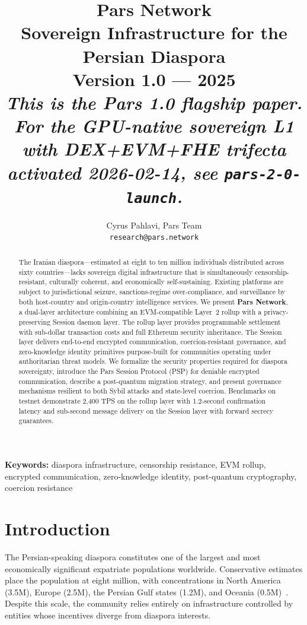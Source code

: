 \documentclass[11pt,a4paper]{article}
\title{
    \vspace{-1cm}
    {\Large\bfseries Pars Network}\\[0.5em]
    {\large Sovereign Infrastructure for the Persian Diaspora}\\[1em]
    {\normalsize Version 1.0 --- 2025}\\[0.4em]
    {\small\itshape This is the Pars 1.0 flagship paper.\\
    For the GPU-native sovereign L1 with DEX+EVM+FHE trifecta\\
    activated 2026-02-14, see \texttt{pars-2-0-launch}.}
}
\author{
    Cyrus Pahlavi, Pars Team\\
    {\small\texttt{research@pars.network}}
}
\date{}
\begin{document}
\parscoverpage


\begin{abstract}
The Iranian diaspora---estimated at eight to ten million individuals distributed across sixty countries---lacks sovereign digital infrastructure that is simultaneously censorship-resistant, culturally coherent, and economically self-sustaining.
Existing platforms are subject to jurisdictional seizure, sanctions-regime over-compliance, and surveillance by both host-country and origin-country intelligence services.
We present \textbf{Pars Network}, a dual-layer architecture combining an EVM-compatible Layer~2 rollup with a privacy-preserving Session daemon layer.
The rollup layer provides programmable settlement with sub-dollar transaction costs and full Ethereum security inheritance.
The Session layer delivers end-to-end encrypted communication, coercion-resistant governance, and zero-knowledge identity primitives purpose-built for communities operating under authoritarian threat models.
We formalize the security properties required for diaspora sovereignty, introduce the Pars Session Protocol (PSP) for deniable encrypted communication, describe a post-quantum migration strategy, and present governance mechanisms resilient to both Sybil attacks and state-level coercion.
Benchmarks on testnet demonstrate 2{,}400 TPS on the rollup layer with 1.2-second confirmation latency and sub-second message delivery on the Session layer with forward secrecy guarantees.
\end{abstract}

\vspace{1em}
\noindent\textbf{Keywords:} diaspora infrastructure, censorship resistance, EVM rollup, encrypted communication, zero-knowledge identity, post-quantum cryptography, coercion resistance

\tableofcontents
\newpage

\section{Introduction}
\label{sec:intro}

The Persian-speaking diaspora constitutes one of the largest and most economically significant expatriate populations worldwide.
Conservative estimates place the population at eight million, with concentrations in North America (3.5M), Europe (2.5M), the Persian Gulf states (1.2M), and Oceania (0.5M)~\cite{bbc_diaspora_2023}.
Despite this scale, the community relies entirely on infrastructure controlled by entities whose incentives diverge from diaspora interests.
\end{document}
